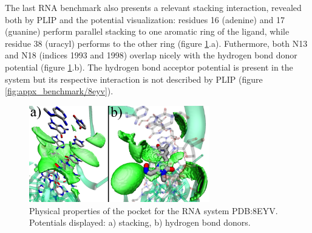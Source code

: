       The last RNA benchmark also presents a relevant stacking interaction, revealed both by PLIP and the potential visualization: residues 16 (adenine) and 17 (guanine) perform parallel stacking to one aromatic ring of the ligand, while residue 38 (uracyl) performs to the other ring (figure \ref{fig:benchmark/8eyv}.a). Futhermore, both N13 and N18 (indices 1993 and 1998) overlap nicely with the hydrogen bond donor potential (figure \ref{fig:benchmark/8eyv}.b). The hydrogen bond acceptor potential is present in the system but its respective interaction is not described by PLIP (figure \ref{fig:appx_benchmark/8eyv}).

      \begin{figure}[H]
        \centering
        \includegraphics[width=0.7\textwidth]{figures/results/benchmark_rna/8eyv.png}
        \caption{\label{fig:benchmark/8eyv} Physical properties of the pocket for the RNA system PDB:8EYV. Potentials displayed: a) stacking, b) hydrogen bond donors.}
      \end{figure}
    \pagebreak


